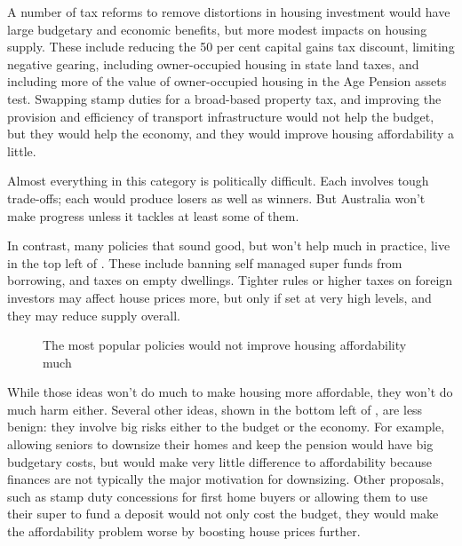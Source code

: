 A number of tax reforms to remove distortions in housing investment would have large budgetary and economic benefits, but more modest impacts on housing supply.
These include reducing the 50 per cent capital gains tax discount, limiting negative gearing, including owner-occupied housing in state land taxes, and including more of the value of owner-occupied housing in the Age Pension assets test.
Swapping stamp duties for a broad-based property tax, and improving the provision and efficiency of transport infrastructure would not help the budget, but they would help the economy, and they would improve housing affordability a little.

Almost everything in this category is politically difficult.
Each involves tough trade-offs; each would produce losers as well as winners.
But Australia won't make progress unless it tackles at least some of them.

In contrast, many policies that sound good, but won't help much in practice, live in the top left of .
These include banning self managed super funds from borrowing, and taxes on empty dwellings.
Tighter rules or higher taxes on foreign investors may affect house prices more, but only if set at very high levels, and they may reduce supply overall.

\begin{figure}
\caption{The most popular policies would not improve housing affordability much}\label{fig:popularity-of-policies}
\end{figure}

While those ideas won't do much to make housing more affordable, they won't do much harm either.
Several other ideas, shown in the bottom left of ,
are less benign: they involve big risks either to the budget or the economy.
For example, allowing seniors to downsize their homes and keep the pension would have big budgetary costs,
 but would make very little difference to affordability because finances are not typically the major motivation for downsizing.
Other proposals, such as stamp duty concessions for first home buyers or allowing them to use their super to fund a deposit would not only cost the budget,
 they would make the affordability problem worse by boosting house prices further.

